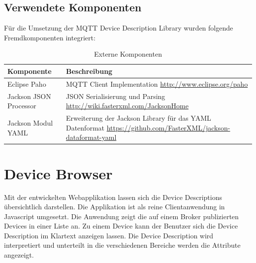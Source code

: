 \subsection{Verwendete Komponenten} {

Für die Umsetzung der MQTT Device Description Library wurden folgende Fremdkomponenten integriert:

\begin{table}[H]
\begin{tabularx}{\textwidth}{|l|X|}

 \hline \rowcolor{lightgray}
 {\bf Komponente } & {\bf Beschreibung }  \\  \hline
 
 Eclipse Paho & MQTT Client Implementation \newline \url{http://www.eclipse.org/paho} \\ \hline

 Jackson JSON Processor & JSON Serialisierung und Parsing \newline \url{http://wiki.fasterxml.com/JacksonHome} \\ \hline
 
 Jackson Modul YAML & Erweiterung der Jackson Library für das YAML Datenformat \newline \url{https://github.com/FasterXML/jackson-dataformat-yaml} \\ \hline
 
\end{tabularx}
\caption{Externe Komponenten}
\end{table}


\section{Device Browser} \label{ums:devBrowser}
Mit der entwickelten Webapplikation lassen sich die Device Descriptions übersichtlich darstellen. Die Applikation ist als reine Clientanwendung in Javascript umgesetzt.
Die Anwendung zeigt die auf einem Broker publizierten Devices in einer Liste an. Zu einem Device kann der Benutzer sich die Device Description im Klartext anzeigen lassen. Die Device Description wird interpretiert und unterteilt in die verschiedenen Bereiche werden die Attribute angezeigt.

}
